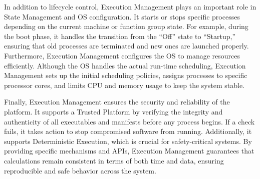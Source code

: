 In addition to lifecycle control, Execution Management plays an important role in State Management and OS configuration. It starts or stops specific processes depending on the current machine or function group state. For example, during the boot phase, it handles the transition from the ``Off'' state to ``Startup,'' ensuring that old processes are terminated and new ones are launched properly. Furthermore, Execution Management configures the OS to manage resources efficiently. Although the OS handles the actual run-time scheduling, Execution Management sets up the initial scheduling policies, assigns processes to specific processor cores, and limits CPU and memory usage to keep the system stable.

Finally, Execution Management ensures the security and reliability of the platform. It supports a Trusted Platform by verifying the integrity and authenticity of all executables and manifests before any process begins. If a check fails, it takes action to stop compromised software from running. Additionally, it supports Deterministic Execution, which is crucial for safety-critical systems. By providing specific mechanisms and APIs, Execution Management guarantees that calculations remain consistent in terms of both time and data, ensuring reproducible and safe behavior across the system.






